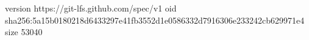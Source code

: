 version https://git-lfs.github.com/spec/v1
oid sha256:5a15b0180218d6433297e41fb3552d1e0586332d7916306e233242cb629971e4
size 53040
